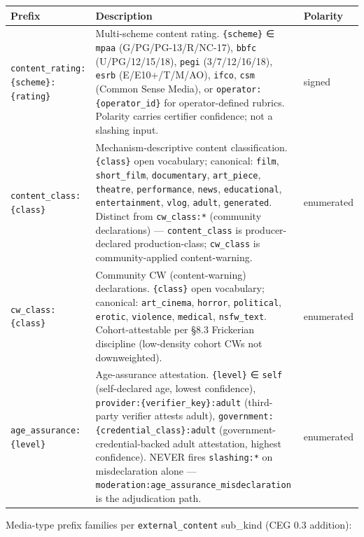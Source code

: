 \documentclass[11pt]{article}
\begin{document}
{\footnotesize
\begin{longtable}{|p{5.33cm}|p{5.33cm}|p{5.33cm}|}\hline
\textbf{Prefix} & \textbf{Description} & \textbf{Polarity} \\ \hline\endhead
\texttt{content\_rating:\{scheme\}:\{rating\}} & Multi-scheme content rating. \texttt{\{scheme\}} ∈ \texttt{mpaa} (G/PG/PG-13/R/NC-17), \texttt{bbfc} (U/PG/12/15/18), \texttt{pegi} (3/7/12/16/18), \texttt{esrb} (E/E10+/T/M/AO), \texttt{ifco}, \texttt{csm} (Common Sense Media), or \texttt{operator:\{operator\_id\}} for operator-defined rubrics. Polarity carries certifier confidence; not a slashing input. & signed \\ \hline
\texttt{content\_class:\{class\}} & Mechanism-descriptive content classification. \texttt{\{class\}} open vocabulary; canonical: \texttt{film}, \texttt{short\_film}, \texttt{documentary}, \texttt{art\_piece}, \texttt{theatre}, \texttt{performance}, \texttt{news}, \texttt{educational}, \texttt{entertainment}, \texttt{vlog}, \texttt{adult}, \texttt{generated}. Distinct from \texttt{cw\_class:*} (community declarations) — \texttt{content\_class} is producer-declared production-class; \texttt{cw\_class} is community-applied content-warning. & enumerated \\ \hline
\texttt{cw\_class:\{class\}} & Community CW (content-warning) declarations. \texttt{\{class\}} open vocabulary; canonical: \texttt{art\_cinema}, \texttt{horror}, \texttt{political}, \texttt{erotic}, \texttt{violence}, \texttt{medical}, \texttt{nsfw\_text}. Cohort-attestable per §8.3 Frickerian discipline (low-density cohort CWs not downweighted). & enumerated \\ \hline
\texttt{age\_assurance:\{level\}} & Age-assurance attestation. \texttt{\{level\}} ∈ \texttt{self} (self-declared age, lowest confidence), \texttt{provider:\{verifier\_key\}:adult} (third-party verifier attests adult), \texttt{government:\{credential\_class\}:adult} (government-credential-backed adult attestation, highest confidence). NEVER fires \texttt{slashing:*} on misdeclaration alone — \texttt{moderation:age\_assurance\_misdeclaration} is the adjudication path. & enumerated \\ \hline
\end{longtable}}


Media-type prefix families per \texttt{external\_content} sub\_kind (CEG 0.3 addition):
\end{document}

